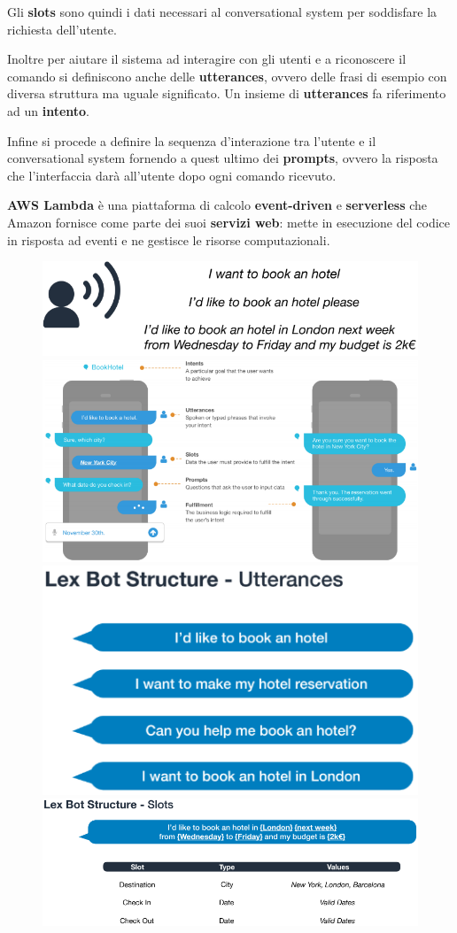 Gli \textbf{slots} sono quindi i dati necessari al conversational system per soddisfare la richiesta dell'utente.

Inoltre per aiutare il sistema ad interagire con gli utenti e a riconoscere il comando si definiscono anche delle \textbf{utterances}, ovvero delle frasi di esempio con diversa struttura ma uguale significato. Un insieme di \textbf{utterances} fa riferimento ad un \textbf{intento}.

Infine si procede a definire la sequenza d'interazione tra l'utente e il conversational system  fornendo a quest ultimo dei \textbf{prompts}, ovvero la risposta che l'interfaccia darà all'utente dopo ogni comando ricevuto.

\pagebreak

\textbf{AWS Lambda} è una piattaforma di calcolo \textbf{event-driven} e \textbf{serverless} che Amazon fornisce come parte dei suoi \textbf{servizi web}: mette in esecuzione del codice in risposta ad eventi e ne gestisce le risorse computazionali.

\begin{figure}[!h]
	\centering
	\includegraphics[scale=0.55]{immagini/Lex_general3.png}
	\includegraphics[scale=0.65]{immagini/Lex_general.png}
	\includegraphics[scale=0.6]{immagini/Lex_general1.png}
	\includegraphics[scale=0.5]{immagini/Lex_general2.png}
\end{figure}
